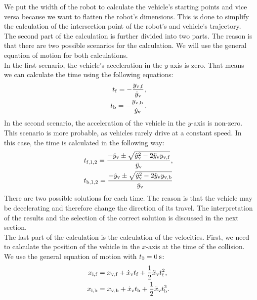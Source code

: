         We put the width of the robot to calculate the vehicle's starting points and vice versa because we want to flatten the robot's dimensions. This is done to simplify the calculation of the intersection point of the robot's and vehicle's trajectory.\\
        The second part of the calculation is further divided into two parts. The reason is that there are two possible scenarios for the calculation. We will use the general equation of motion \cite{equation_motion} for both calculations.\\
        In the first scenario, the vehicle's acceleration in the $y$-axis is zero. That means we can calculate the time using the following equations:
        \begin{align}
            t_{\rm{f}} = -\frac{y_{\rm{v,f}}}{\dot{y}_{\rm{v}}},\\
            t_{\rm{b}} = -\frac{y_{\rm{v,b}}}{\dot{y}_{\rm{v}}}.
        \end{align}
        In the second scenario, the acceleration of the vehicle in the $y$-axis is non-zero. This scenario is more probable, as vehicles rarely drive at a constant speed. In this case, the time is calculated in the following way:
        \begin{align}
            t_{\rm{f},1,2} = \frac{-\dot{y}_{\rm{v}}\pm\sqrt{\dot{y}_{\rm{v}}^2-2\ddot{y}_{\rm{v}}y_{\rm{v,f}}}}{\ddot{y}_{\rm{v}}},\\
            t_{\rm{b},1,2} = \frac{-\dot{y}_{\rm{v}}\pm\sqrt{\dot{y}_{\rm{v}}^2-2\ddot{y}_{\rm{v}}y_{\rm{v,b}}}}{\ddot{y}_{\rm{v}}}
        \end{align}
        There are two possible solutions for each time. The reason is that the vehicle may be decelerating and therefore change the direction of its travel. The interpretation of the results and the selection of the correct solution is discussed in the next section.\\
        The last part of the calculation is the calculation of the velocities. First, we need to calculate the position of the vehicle in the $x$-axis at the time of the collision. We use the general equation of motion with $t_{0}=0\:\rm{s}$:
        \begin{align}
            x_{\rm{i,f}} &= x_{\rm{v,f}} + \dot{x}_{\rm{v}}t_{\rm{f}} + \frac{1}{2}\ddot{x}_{\rm{v}}t_{\rm{f}}^2,\\
            x_{\rm{i,b}} &= x_{\rm{v,b}} + \dot{x}_{\rm{v}}t_{\rm{b}} + \frac{1}{2}\ddot{x}_{\rm{v}}t_{\rm{b}}^2.
        \end{align}
